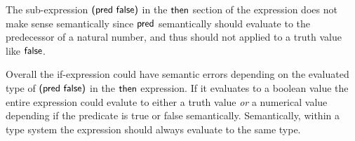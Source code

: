 \documentclass[12pt, fleqn]{article}
\begin{document}
\begin{enumerate}
\begin{enumerate}
The sub-expression $\mbox{\sf (pred false)}$ in the $\mbox{\sf then}$ section of the expression does not make sense semantically since $\mbox{\sf pred}$ semantically
should evaluate to the predecessor of a natural number, and thus should not applied to a truth value like $\mbox{\sf false}$.

Overall the if-expression could have semantic errors depending on the evaluated type of $\mbox{\sf (pred false)}$ in the $\mbox{\sf then}$ expression. If it
evaluates to a boolean value the entire expression could evalute to either a truth value \emph{or} a numerical value depending if the predicate is true or false
semantically. Semantically, within a type system the expression should always evaluate to the same type.

\end{enumerate}

\end{enumerate}
\end{document}
